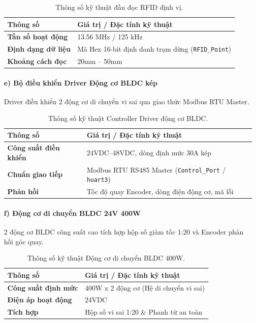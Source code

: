 \documentclass{article}
\begin{document}
\begin{table}[!htbp]
\centering
\begin{tabularx}{\textwidth}{|>{\bfseries}l|X|}
\hline
\rowcolor{lightgray} Thông số & Giá trị / Đặc tính kỹ thuật \\ \hline
Tần số hoạt động & 13.56 MHz / 125 kHz \\ \hline
Định dạng dữ liệu & Mã Hex 16-bit định danh trạm dừng (\texttt{RFID\_Point}) \\ \hline
Khoảng cách đọc & 20mm -- 50mm \\ \hline
\end{tabularx}
\caption{Thông số kỹ thuật đầu đọc RFID định vị.}
\label{tab:spec_rfid}
\end{table}

\paragraph{e) Bộ điều khiển Driver Động cơ BLDC kép}
Driver điều khiển 2 động cơ di chuyển vi sai qua giao thức Modbus RTU Master.

\begin{table}[!htbp]
\centering
\begin{tabularx}{\textwidth}{|>{\bfseries}l|X|}
\hline
\rowcolor{lightgray} Thông số & Giá trị / Đặc tính kỹ thuật \\ \hline
Công suất điều khiển & 24VDC--48VDC, dòng định mức 30A kép \\ \hline
Chuẩn giao tiếp & Modbus RTU RS485 Master (\texttt{Control\_Port} / \texttt{huart3}) \\ \hline
Phản hồi & Tốc độ quay Encoder, dòng điện động cơ, mã lỗi \\ \hline
\end{tabularx}
\caption{Thông số kỹ thuật Controller Driver động cơ BLDC.}
\label{tab:spec_driver}
\end{table}

\paragraph{f) Động cơ di chuyển BLDC 24V 400W}
2 động cơ BLDC công suất cao tích hợp hộp số giảm tốc 1:20 và Encoder phản hồi góc quay.

\begin{table}[!htbp]
\centering
\begin{tabularx}{\textwidth}{|>{\bfseries}l|X|}
\hline
\rowcolor{lightgray} Thông số & Giá trị / Đặc tính kỹ thuật \\ \hline
Công suất định mức & 400W x 2 động cơ (Hệ di chuyển vi sai) \\ \hline
Điện áp hoạt động & 24VDC \\ \hline
Tích hợp & Hộp số vi sai 1:20 \& Phanh từ an toàn \\ \hline
\end{tabularx}
\caption{Thông số kỹ thuật Động cơ di chuyển BLDC 400W.}
\label{tab:spec_motor}
\end{table}
\end{document}
